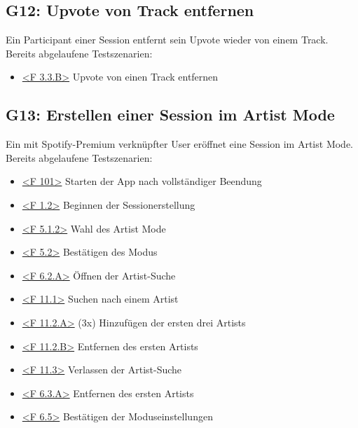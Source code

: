 \documentclass[oneside, ngerman]{sdqtechreport}
\begin{document}
\subsection{G12: Upvote von Track entfernen}
\label{subsec:Tests:GrundlegendeTestszenarien:G12}
\hypertarget{G12}{}
\newcommand{\gTwelve}{\hyperlink{G12}{G12: Upvote von Track entfernen }}
Ein Participant einer Session entfernt sein Upvote wieder von einem Track. \\
Bereits abgelaufene Testszenarien: \gSix
\begin{itemize}
    \item \hyperlink{<F 3.3.B>}{<F 3.3.B>} Upvote von einen Track entfernen
\end{itemize}

\subsection{G13: Erstellen einer Session im Artist Mode}
\label{subsec:Tests:GrundlegendeTestszenarien:G13}
\hypertarget{G13}{}
\newcommand{\gThirteen}{\hyperlink{G13}{G13: Erstellen einer Session im Artist Mode }}
Ein mit Spotify-Premium verknüpfter User eröffnet eine Session im Artist Mode. \\
Bereits abgelaufene Testszenarien: \gNine
\begin{itemize}
    \item \hyperlink{<F 101>}{<F 101>} Starten der App nach vollständiger Beendung
    \item \hyperlink{<F 1.2>}{<F 1.2>} Beginnen der Sessionerstellung
    \item \hyperlink{<F 5.1.2>}{<F 5.1.2>} Wahl des Artist Mode
    \item \hyperlink{<F 5.2>}{<F 5.2>} Bestätigen des Modus
    \item \hyperlink{<F 6.2.A>}{<F 6.2.A>} Öffnen der Artist-Suche
    \item \hyperlink{<F 11.1>}{<F 11.1>} Suchen nach einem Artist
    \item \hyperlink{<F 11.2.A>}{<F 11.2.A>} (3x) Hinzufügen der ersten drei Artists
    \item \hyperlink{<F 11.2.B>}{<F 11.2.B>} Entfernen des ersten Artists
    \item \hyperlink{<F 11.3>}{<F 11.3>} Verlassen der Artist-Suche
    \item \hyperlink{<F 6.3.A>}{<F 6.3.A>} Entfernen des ersten Artists
    \item \hyperlink{<F 6.5>}{<F 6.5>} Bestätigen der Moduseinstellungen
\end{itemize}
\end{document}
